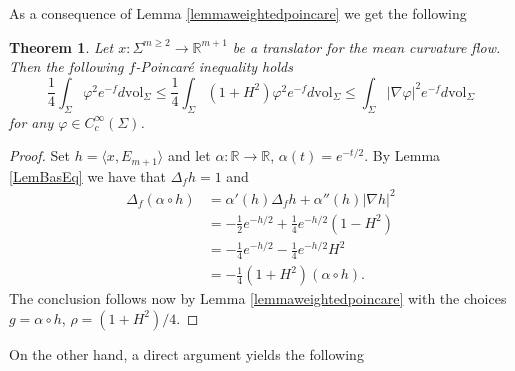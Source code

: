 \documentclass[11pt, leqno]{amsart}
\newtheorem{theorem}{Theorem}[section]
\begin{document}
As a consequence of Lemma \ref{lemmaweightedpoincare} we get the following 
\begin{theorem}
Let $x:\Sigma^{m\geq 2}\to\mathbb{R}^{m+1}$ be a translator for the mean curvature flow. Then the following $f$-Poincar\'e inequality holds
\begin{equation}\label{eqfpoincaretranslators}
\frac{1}{4}\int_\Sigma \varphi^2 e^{-f}d\mathrm{vol}_{\Sigma}\leq \frac{1}{4}\int_\Sigma (1+H^2) \varphi^2 e^{-f}d\mathrm{vol}_{\Sigma}\leq \int_\Sigma |\nabla \varphi|^2 e^{-f}d\mathrm{vol}_{\Sigma}
\end{equation}
for any $\varphi\in C^{\infty}_c(\Sigma)$.
\end{theorem}
\begin{proof}
Set $h=\langle x,E_{m+1}\rangle$ and let $\alpha:\mathbb{R}\to\mathbb{R}$, $\alpha(t)=e^{-t/2}$. By Lemma \ref{LemBasEq} we have that $\Delta_f h=1$ and
\begin{align*}
\Delta_f (\alpha\circ h)&=\alpha'(h)\Delta_f h+\alpha''(h)|\nabla h|^2\\
&= -\frac{1}{2}e^{-h/2}+\frac{1}{4}e^{-h/2}(1-H^2)\\
&=-\frac{1}{4}e^{-h/2}-\frac{1}{4}e^{-h/2}H^2\\
&= -\frac{1}{4}(1+H^2)(\alpha\circ h).
\end{align*}
The conclusion follows now by Lemma \ref{lemmaweightedpoincare} with the choices $g=\alpha\circ h$, $\rho=(1+H^2)/4$.
\end{proof}

On the other hand, a direct argument yields the following
\end{document}
